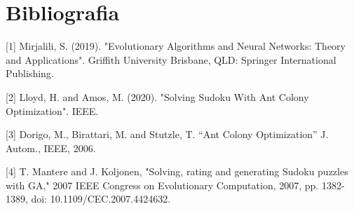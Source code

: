 \documentclass[11pt]{scrartcl} %
\begin{document}
\section{Bibliografia}
[1] Mirjalili, S. (2019). "Evolutionary Algorithms and Neural Networks: Theory and Applications". Griffith University Brisbane, QLD: Springer International Publishing.

[2] Lloyd, H. and Amos, M. (2020). "Solving Sudoku With Ant Colony Optimization". IEEE.

[3] Dorigo, M., Birattari, M. and Stutzle, T. “Ant Colony Optimization” J. Autom., IEEE, 2006.

[4] T. Mantere and J. Koljonen, "Solving, rating and generating Sudoku puzzles with GA," 2007 IEEE Congress on Evolutionary Computation, 2007, pp. 1382-1389, doi: 10.1109/CEC.2007.4424632.
\end{document}
